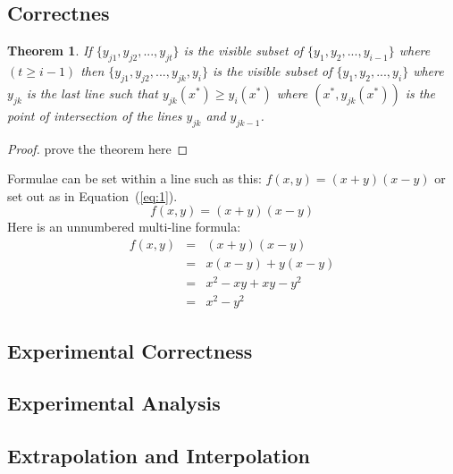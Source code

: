\documentclass{article}
\newtheorem{theorem}{Theorem}
\begin{document}
\subsection*{Correctnes}

\begin{theorem}
  If \emph{$\{y_{j1},y_{j2},...,y_{jt}\}$} is the visible subset of \emph{$\{y_{1},y_{2},...,y_{i-1}\}$} where \emph{$(t \geq i-1)$} then $\{y_{j1},y_{j2},...,y_{jk},y_{i}\}$ is the visible subset of $\{y_{1},y_{2},...,y_{i}\}$ where $y_{jk}$ is the last line such that $y_{jk}(x^{*}) \geq y_{i}(x^{*})$ where $(x^{*},y_{jk}(x^{*}))$ is the point of intersection of the lines $y_{jk}$ and $y_{jk-1}$.
\end{theorem}

\begin{proof}
prove the theorem here
\end{proof}


Formulae can be set within a line such as this: $f(x,y) = (x+y)(x-y)$
or set out as in Equation~(\ref{eq:1}).
\begin{equation}
  \label{eq:1}
  f(x,y) = (x+y)(x-y)
\end{equation}
Here is an unnumbered multi-line formula:
\begin{eqnarray*}
  \label{eq:2}
  f(x,y) &= & (x+y)(x-y) \\
  & = & x(x-y) + y(x-y) \\
  & = & x^2 - xy + xy - y^2 \\
  & = & x^2-y^2
\end{eqnarray*}

\subsection*{Experimental Correctness}


\subsection*{Experimental Analysis}


\subsection*{Extrapolation and Interpolation}
\end{document}
